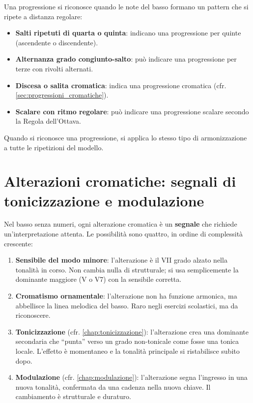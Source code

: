 \begin{regola}
	\label{reg:riconoscimento_progressione}
	Una progressione si riconosce quando le note del basso formano un pattern che si ripete a distanza regolare:
	\begin{itemize}
		\item \textbf{Salti ripetuti di quarta o quinta}: indicano una progressione per quinte (ascendente o discendente).
		\item \textbf{Alternanza grado congiunto-salto}: può indicare una progressione per terze con rivolti alternati.
		\item \textbf{Discesa o salita cromatica}: indica una progressione cromatica (cfr. \ref{sec:progressioni_cromatiche}).
		\item \textbf{Scalare con ritmo regolare}: può indicare una progressione scalare secondo la Regola dell'Ottava.
	\end{itemize}
	Quando si riconosce una progressione, si applica lo stesso tipo di armonizzazione a tutte le ripetizioni del modello.
\end{regola}

\section{Alterazioni cromatiche: segnali di tonicizzazione e modulazione}
\label{sec:cromatismi_basso}

Nel basso senza numeri, ogni alterazione cromatica è un \textbf{segnale} che richiede un'interpretazione attenta. Le possibilità sono quattro, in ordine di complessità crescente:

\begin{enumerate}
	\item \textbf{Sensibile del modo minore}: l'alterazione è il VII grado alzato nella tonalità in corso. Non cambia nulla di strutturale; si usa semplicemente la dominante maggiore (V o V7) con la sensibile corretta.
	\item \textbf{Cromatismo ornamentale}: l'alterazione non ha funzione armonica, ma abbellisce la linea melodica del basso. Raro negli esercizi scolastici, ma da riconoscere.
	\item \textbf{Tonicizzazione} (cfr. \ref{chap:tonicizzazione}): l'alterazione crea una dominante secondaria che ``punta'' verso un grado non-tonicale come fosse una tonica locale. L'effetto è momentaneo e la tonalità principale si ristabilisce subito dopo.
	\item \textbf{Modulazione} (cfr. \ref{chap:modulazione}): l'alterazione segna l'ingresso in una nuova tonalità, confermata da una cadenza nella nuova chiave. Il cambiamento è strutturale e duraturo.
\end{enumerate}

